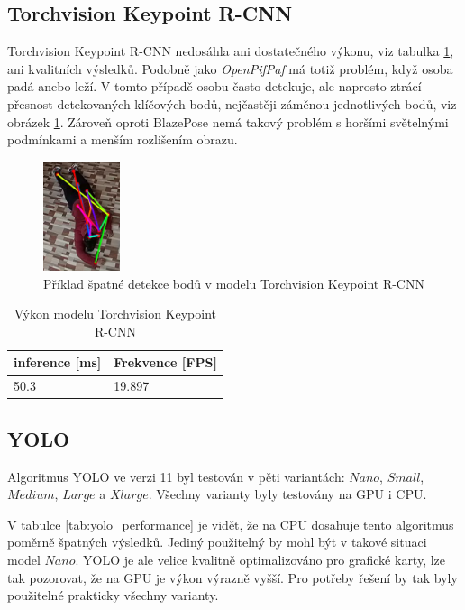 \subsection{Torchvision Keypoint R-CNN}

Torchvision Keypoint R-CNN nedosáhla ani dostatečného výkonu, viz tabulka
\ref{tab:torchvision_performance}, ani kvalitních výsledků. Podobně jako
\textit{OpenPifPaf} má totiž problém, když osoba padá anebo leží. V tomto
případě osobu často detekuje, ale naprosto ztrácí přesnost detekovaných
klíčových bodů, nejčastěji záměnou jednotlivých bodů, viz obrázek
\ref{fig:torchvision_bad}. Zároveň oproti BlazePose nemá takový problém s
horšími světelnými podmínkami a menším rozlišením obrazu.

\begin{figure}[]
    \centering
    \includegraphics[width=0.2\textwidth]{Figures/pose_tests/torchvision_bad.png}
    \caption{Příklad špatné detekce bodů v modelu Torchvision Keypoint R-CNN}
    \label{fig:torchvision_bad}
\end{figure}

\begin{table}[htbp]
    \centering
    \caption{Výkon modelu Torchvision Keypoint R-CNN}
    \label{tab:torchvision_performance}
    \begin{tabular}{|l|l|}
        \hline
        \textbf{inference [ms]} & \textbf{Frekvence [FPS]} \\
        \hline
        50.3                    & 19.897                   \\ \hline
    \end{tabular}
\end{table}

\subsection{YOLO}

Algoritmus YOLO ve verzi 11 byl testován v pěti variantách: $Nano$, $Small$,
$Medium$, $Large$ a $Xlarge$. Všechny varianty byly testovány na GPU i CPU.

V tabulce \ref{tab:yolo_performance} je vidět, že na CPU dosahuje tento
algoritmus poměrně špatných výsledků. Jediný použitelný by mohl být v takové
situaci model $Nano$. YOLO je ale velice kvalitně optimalizováno pro grafické
karty, lze tak pozorovat, že na GPU je výkon výrazně vyšší. Pro potřeby řešení
by tak byly použitelné prakticky všechny varianty.

